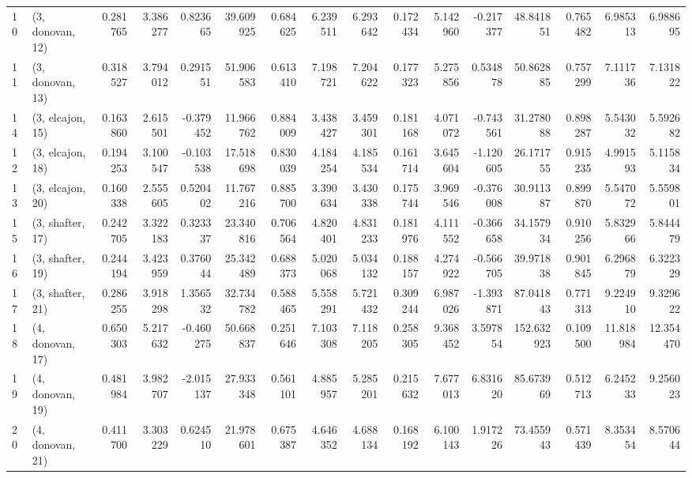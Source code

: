 \begin{tabular}{llrrrrrrrrrrrrrr}
10 &  (3, donovan, 12) &   0.281765 &  3.386277 &  0.823665 &  39.609925 &  0.684625 &   6.239511 &  6.293642 &  0.172434 &  5.142960 & -0.217377 &   48.841851 &  0.765482 &   6.985313 &   6.988695 \\
11 &  (3, donovan, 13) &   0.318527 &  3.794012 &  0.291551 &  51.906583 &  0.613410 &   7.198721 &  7.204622 &  0.177323 &  5.275856 &  0.534878 &   50.862885 &  0.757299 &   7.111736 &   7.131822 \\
14 &  (3, elcajon, 15) &   0.163860 &  2.615501 & -0.379452 &  11.966762 &  0.884009 &   3.438427 &  3.459301 &  0.181168 &  4.071072 & -0.743561 &   31.278088 &  0.898287 &   5.543032 &   5.592682 \\
12 &  (3, elcajon, 18) &   0.194253 &  3.100547 & -0.103538 &  17.518698 &  0.830039 &   4.184254 &  4.185534 &  0.161714 &  3.645604 & -1.120605 &   26.171755 &  0.915235 &   4.991593 &   5.115834 \\
13 &  (3, elcajon, 20) &   0.160338 &  2.555605 &  0.520402 &  11.767216 &  0.885700 &   3.390634 &  3.430338 &  0.175744 &  3.969546 & -0.376008 &   30.911387 &  0.899870 &   5.547072 &   5.559801 \\
15 &  (3, shafter, 17) &   0.242705 &  3.322183 &  0.323337 &  23.340816 &  0.706564 &   4.820401 &  4.831233 &  0.181976 &  4.111552 & -0.366658 &   34.157934 &  0.910256 &   5.832966 &   5.844479 \\
16 &  (3, shafter, 19) &   0.244194 &  3.423959 &  0.376044 &  25.342489 &  0.688373 &   5.020068 &  5.034132 &  0.188157 &  4.274922 & -0.566705 &   39.971838 &  0.901845 &   6.296879 &   6.322329 \\
17 &  (3, shafter, 21) &   0.286255 &  3.918298 &  1.356532 &  32.734782 &  0.588465 &   5.558291 &  5.721432 &  0.309244 &  6.987026 & -1.393871 &   87.041843 &  0.771313 &   9.224910 &   9.329622 \\
18 &  (4, donovan, 17) &   0.650303 &  5.217632 & -0.460275 &  50.668837 &  0.251646 &   7.103308 &  7.118205 &  0.258305 &  9.368452 &  3.597854 &  152.632923 &  0.109500 &  11.818984 &  12.354470 \\
19 &  (4, donovan, 19) &   0.481984 &  3.982707 & -2.015137 &  27.933348 &  0.561101 &   4.885957 &  5.285201 &  0.215632 &  7.677013 &  6.831620 &   85.673969 &  0.512713 &   6.245233 &   9.256023 \\
20 &  (4, donovan, 21) &   0.411700 &  3.303229 &  0.624510 &  21.978601 &  0.675387 &   4.646352 &  4.688134 &  0.168192 &  6.100143 &  1.917226 &   73.455943 &  0.571439 &   8.353454 &   8.570644 \\

\end{tabular}
